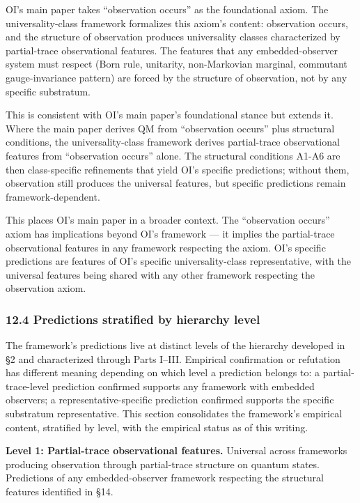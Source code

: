 \documentclass[
]{article}
\begin{document}
OI's main paper takes ``observation occurs'' as the foundational axiom.
The universality-class framework formalizes this axiom's content:
observation occurs, and the structure of observation produces
universality classes characterized by partial-trace observational
features. The features that any embedded-observer system must respect
(Born rule, unitarity, non-Markovian marginal, commutant
gauge-invariance pattern) are forced by the structure of observation,
not by any specific substratum.

This is consistent with OI's main paper's foundational stance but
extends it. Where the main paper derives QM from ``observation occurs''
plus structural conditions, the universality-class framework derives
partial-trace observational features from ``observation occurs'' alone.
The structural conditions A1-A6 are then class-specific refinements that
yield OI's specific predictions; without them, observation still
produces the universal features, but specific predictions remain
framework-dependent.

This places OI's main paper in a broader context. The ``observation
occurs'' axiom has implications beyond OI's framework --- it implies the
partial-trace observational features in any framework respecting the
axiom. OI's specific predictions are features of OI's specific
universality-class representative, with the universal features being
shared with any other framework respecting the observation axiom.

\hypertarget{predictions-stratified-by-hierarchy-level-1}{%
\subsubsection{12.4 Predictions stratified by hierarchy
level}\label{predictions-stratified-by-hierarchy-level-1}}

The framework's predictions live at distinct levels of the hierarchy
developed in §2 and characterized through Parts I--III. Empirical
confirmation or refutation has different meaning depending on which
level a prediction belongs to: a partial-trace-level prediction
confirmed supports any framework with embedded observers; a
representative-specific prediction confirmed supports the specific
substratum representative. This section consolidates the framework's
empirical content, stratified by level, with the empirical status as of
this writing.

\textbf{Level 1: Partial-trace observational features.} Universal across
frameworks producing observation through partial-trace structure on
quantum states. Predictions of any embedded-observer framework
respecting the structural features identified in §14.
\end{document}
